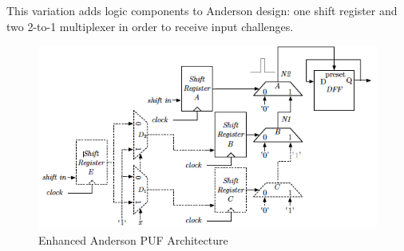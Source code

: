 \documentclass[../tesi.tex]{subfiles}
\begin{document}
This variation adds logic components to Anderson \puf{} design: one shift register and two 2-to-1 multiplexer in order to receive input challenges. 
\begin{figure}
\centering
\includegraphics[scale=0.55]{images/ehnancedpuf.png}
\caption{Enhanced Anderson PUF Architecture}
\label{fig:ehnancedanderpuf}
\end{figure} 
\end{document}
